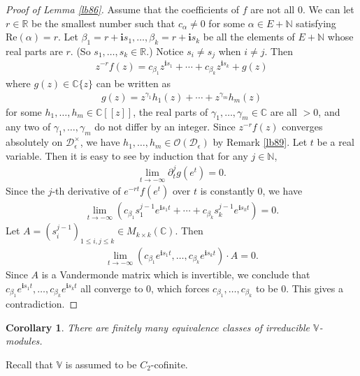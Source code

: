 \documentclass[12pt,b5paper,notitlepage]{report}
\theoremstyle{definition}
\theoremstyle{plain}
\newtheorem{co}[df]{Corollary}
\newcommand{\mc}{\mathcal}
\newcommand{\scr}{\mathscr}
\newcommand{\im}{\mathbf{i}}
\newcommand{\Vbb}{\mathbb V}
\newcommand{\Cbb}{\mathbb C}
\newcommand{\Nbb}{\mathbb N}
\newcommand{\Rbb}{\mathbb R}
\numberwithin{equation}{section}
\begin{document}
\begin{proof}[Proof of Lemma \ref{lb86}]
Assume that the coefficients of $f$ are not all $0$. We can let $r\in\Rbb$ be the smallest number such that $c_\alpha\neq 0$ for some $\alpha\in E+\Nbb$ satisfying $\mathrm{Re}(\alpha)=r$. Let $\beta_1=r+\im s_1,\dots,\beta_k=r+\im s_k$ be all the elements of $E+\Nbb$ whose real parts are $r$. (So $s_1,\dots,s_k\in\Rbb$.) Notice $s_i\neq s_j$ when $i\neq j$. Then 
\begin{align*}
z^{-r}f(z)=c_{\beta_1}z^{\im s_1}+\cdots +c_{\beta_k}z^{\im s_k}+g(z)
\end{align*}
where $g(z)\in\Cbb\{z\}$ can be written as
\begin{align*}
g(z)=z^{\gamma_1}h_1(z)+\cdots+z^{\gamma_m}h_m(z)
\end{align*}
for some $h_1,\dots,h_m\in\Cbb[[z]]$,  the real parts of $\gamma_1,\dots,\gamma_m\in\Cbb$ are all $>0$, and any two of $\gamma_1,\dots,\gamma_m$ do not differ by an integer. Since $z^{-r}f(z)$ converges absolutely on $\mc D_\epsilon^\times$, we have $h_1,\dots,h_m\in\scr O(\mc D_\epsilon)$ by Remark \ref{lb89}. Let $t$ be a real variable.  Then it is easy to see by induction  that for any $j\in\Nbb$,
\begin{align*}
\lim_{t\rightarrow-\infty}\partial_t^jg(e^t)=0.
\end{align*}
Since the $j$-th derivative of $e^{-rt}f(e^t)$ over $t$ is constantly $0$, we have
\begin{align*}
\lim_{t\rightarrow-\infty}(c_{\beta_1}s_1^{j-1}e^{\im s_1 t}+\cdots +c_{\beta_k}s_k^{j-1}e^{\im s_k t})=0.
\end{align*}
Let $A=(s_i^{j-1})_{1\leq i,j\leq k}\in M_{k\times k}(\Cbb)$.  Then
\begin{align*}
\lim_{t\rightarrow-\infty} (c_{\beta_1} e^{\im s_1t},\dots,c_{\beta_k} e^{\im s_k t})\cdot A=0.
\end{align*} 
Since $A$ is a Vandermonde matrix which is invertible, we conclude that $c_{\beta_1} e^{\im s_1t},\dots,c_{\beta_k} e^{\im s_k t}$ all converge to $0$, which forces $c_{\beta_1},\dots,c_{\beta_k}$ to be $0$. This gives a contradiction.
\end{proof}



\begin{co}\label{lb118}
There are finitely many equivalence classes of irreducible $\Vbb$-modules.
\end{co}

Recall that $\Vbb$ is assumed to be $C_2$-cofinite.
\end{document}
